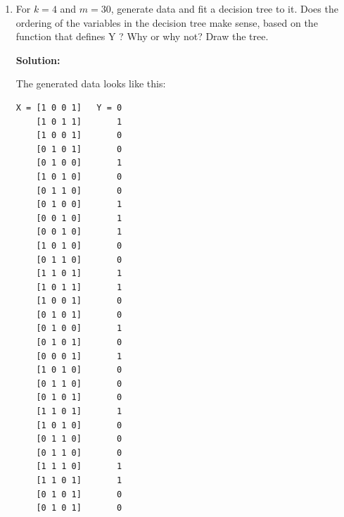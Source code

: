 \documentclass[letter, 12pt]{article}
\begin{document}
\begin{enumerate}
\begin{verbatim}
def fit_decision_tree(X, Y, node, p_vis):
    m, k = X.shape
    P_y = np.count_nonzero(Y) / m
    H_y = entropy(P_y, 1 - P_y)
    maxx = 0
    max_id = -1
    vis = np.copy(p_vis)
    for i in range(k):
        if vis[i] == 1:
            continue
        IG = H_y - IC(X[:, i], Y)
        if IG > maxx:
            maxx = IG
            max_id = i
    if max_id != -1:
        vis[max_id] = 1
        new_X_0 = np.copy(X)
        new_X_1 = np.copy(X)
        new_Y_0 = np.copy(Y)
        new_Y_1 = np.copy(Y)
        for i in range(m - 1, -1, -1):
            if new_X_0[i][max_id] > 1 - eps:
                new_X_0 = np.delete(new_X_0, i, axis = 0)
                new_Y_0 = np.delete(new_Y_0, i, axis = 0)
            if new_X_1[i][max_id] < eps:
                new_X_1 = np.delete(new_X_1, i, axis = 0)
                new_Y_1 = np.delete(new_Y_1, i, axis = 0)
        node.x_id = max_id
        if new_X_0.shape[0] > 0:
            node.equals_zero = Node(None)
            fit_decision_tree(new_X_0, new_Y_0, node.equals_zero, vis)
        if new_X_1.shape[0] > 0:
            node.equals_one = Node(None)
            fit_decision_tree(new_X_1, new_Y_1, node.equals_one, vis)
    else:
        if P_y >= 0.5:
            node.y = 1
        else:
            node.y = 0
        \end{verbatim}
        \item {For $ k = 4 $ and $ m = 30 $, generate data and fit a decision tree to it. Does the ordering of the variables in the
            decision tree make sense, based on the function that defines Y ? Why or why not? Draw the tree.} 
        \par{\textbf{Solution:}}
        \par{The generated data looks like this:}
        \begin{lstlisting}[backgroundcolor = \color{lightgray}]
X = [1 0 0 1]   Y = 0
    [1 0 1 1]       1
    [1 0 0 1]       0
    [0 1 0 1]       0
    [0 1 0 0]       1
    [1 0 1 0]       0
    [0 1 1 0]       0
    [0 1 0 0]       1
    [0 0 1 0]       1
    [0 0 1 0]       1
    [1 0 1 0]       0
    [0 1 1 0]       0
    [1 1 0 1]       1
    [1 0 1 1]       1
    [1 0 0 1]       0
    [0 1 0 1]       0
    [0 1 0 0]       1
    [0 1 0 1]       0
    [0 0 0 1]       1
    [1 0 1 0]       0
    [0 1 1 0]       0
    [0 1 0 1]       0
    [1 1 0 1]       1
    [1 0 1 0]       0
    [0 1 1 0]       0
    [0 1 1 0]       0
    [1 1 1 0]       1
    [1 1 0 1]       1
    [0 1 0 1]       0
    [0 1 0 1]       0
        \end{lstlisting}

\end{enumerate}
\end{document}
